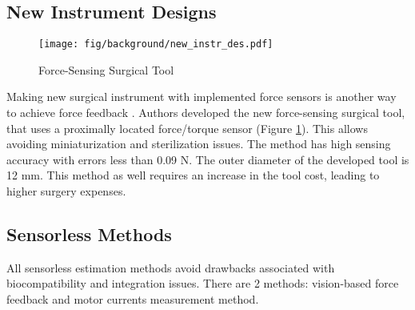 \subsection{New Instrument Designs}
\begin{figure}[h]
	\begin{center}
	\texttt{[image: fig/background/new\_instr\_des.pdf]}
	\end{center}
	\vspace{-4mm}
	\caption[Force-Sensing Surgical Tool]
	{ Force-Sensing Surgical Tool \cite{schwalb_forcesensing_2017}}
	\label{fig:force_sen_tool}
	\vspace{-2mm}
\end{figure}

Making new surgical instrument with implemented force sensors is another way to achieve force feedback \cite{schwalb_forcesensing_2017}. Authors developed the new force-sensing surgical tool, that uses a proximally located force/torque sensor (Figure \ref{fig:force_sen_tool}). This allows avoiding miniaturization and sterilization issues. The method has high sensing accuracy with errors less than 0.09 N. The outer diameter of the developed tool is 12 mm. This method as well requires an increase in the tool cost, leading to higher surgery expenses.

\subsection{Sensorless Methods}

All sensorless estimation methods avoid drawbacks associated with biocompatibility and integration issues. There are 2 methods: vision-based force feedback and motor currents measurement method.

